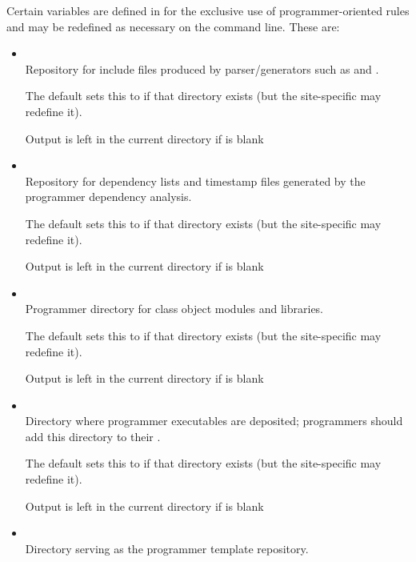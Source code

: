 Certain variables are defined in  for the exclusive use of
programmer-oriented rules and may be redefined as necessary on the
 command line.  These are:

\begin{itemize}
\item
   \\ Repository for include files produced by parser/generators such as
    and .

   The default  sets this to  if that directory
   exists (but the site-specific  may redefine it).

   Output is left in the current directory if  is blank

\item
   \\ Repository for dependency lists and timestamp files generated by the
   programmer dependency analysis.

   The default  sets this to  if that
   directory exists (but the site-specific  may redefine it).

   Output is left in the current directory if  is blank

\item
   \\ Programmer directory for class object modules and libraries.

   The default  sets this to  if that
   directory exists (but the site-specific  may redefine it).

   Output is left in the current directory if  is blank

\item
   \\ Directory where programmer executables are deposited; programmers should
   add this directory to their .

   The default  sets this to  if that
   directory exists (but the site-specific  may redefine it).

   Output is left in the current directory if  is blank

\item
   \\ Directory serving as the programmer template repository.


\end{itemize}
